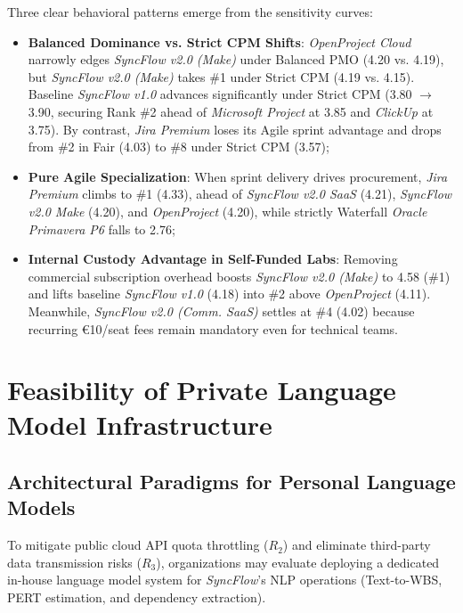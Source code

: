 Three clear behavioral patterns emerge from the sensitivity curves:
\begin{itemize}[itemsep=1pt,topsep=1pt]
    \item \textbf{Balanced Dominance vs. Strict CPM Shifts}: \textit{OpenProject Cloud} narrowly edges \textit{SyncFlow v2.0 (Make)} under Balanced PMO (4.20 vs. 4.19), but \textit{SyncFlow v2.0 (Make)} takes \#1 under Strict CPM (4.19 vs. 4.15). Baseline \textit{SyncFlow v1.0} advances significantly under Strict CPM (3.80 $\to$ 3.90, securing Rank \#2 ahead of \textit{Microsoft Project} at 3.85 and \textit{ClickUp} at 3.75). By contrast, \textit{Jira Premium} loses its Agile sprint advantage and drops from \#2 in Fair (4.03) to \#8 under Strict CPM (3.57);
    \item \textbf{Pure Agile Specialization}: When sprint delivery drives procurement, \textit{Jira Premium} climbs to \#1 (4.33), ahead of \textit{SyncFlow v2.0 SaaS} (4.21), \textit{SyncFlow v2.0 Make} (4.20), and \textit{OpenProject} (4.20), while strictly Waterfall \textit{Oracle Primavera P6} falls to 2.76;
    \item \textbf{Internal Custody Advantage in Self-Funded Labs}: Removing commercial subscription overhead boosts \textit{SyncFlow v2.0 (Make)} to 4.58 (\#1) and lifts baseline \textit{SyncFlow v1.0} (4.18) into \#2 above \textit{OpenProject} (4.11). Meanwhile, \textit{SyncFlow v2.0 (Comm. SaaS)} settles at \#4 (4.02) because recurring €10/seat fees remain mandatory even for technical teams.
\end{itemize}

\newpage

\section{Feasibility of Private Language Model Infrastructure}
\subsection{Architectural Paradigms for Personal Language Models}
To mitigate public cloud API quota throttling ($R_2$) and eliminate third-party data transmission risks ($R_3$), organizations may evaluate deploying a dedicated in-house language model system for \textit{SyncFlow}'s NLP operations (Text-to-WBS, PERT estimation, and dependency extraction). 

